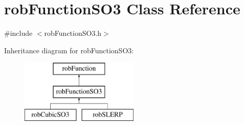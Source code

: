 \hypertarget{classrob_function_s_o3}{\section{rob\-Function\-S\-O3 Class Reference}
\label{classrob_function_s_o3}
}


{\ttfamily \#include $<$rob\-Function\-S\-O3.\-h$>$}

Inheritance diagram for rob\-Function\-S\-O3\-:\begin{figure}[H]
\begin{center}
\leavevmode
\includegraphics[height=3.000000cm]{d8/d7c/classrob_function_s_o3}
\end{center}
\end{figure}
